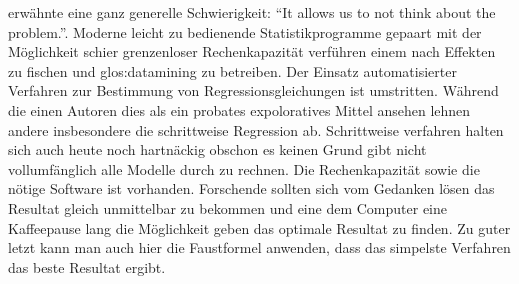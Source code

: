  erwähnte eine ganz generelle Schwierigkeit: ``It allows us to not think about the problem.''.
Moderne leicht zu bedienende Statistikprogramme gepaart mit der Möglichkeit schier grenzenloser Rechenkapazität verführen einem nach Effekten zu fischen und \gls{glos:datamining} zu betreiben.
Der Einsatz automatisierter Verfahren zur Bestimmung von Regressionsgleichungen ist umstritten. 
Während die einen Autoren dies als ein probates expoloratives Mittel ansehen lehnen andere insbesondere die schrittweise Regression ab. 
Schrittweise verfahren halten sich auch heute noch hartnäckig obschon es keinen Grund gibt nicht vollumfänglich alle Modelle durch zu rechnen. 
Die Rechenkapazität sowie die nötige Software ist vorhanden. 
Forschende sollten sich vom Gedanken lösen das Resultat gleich unmittelbar zu bekommen und eine dem Computer eine Kaffeepause lang die Möglichkeit geben das optimale Resultat zu finden.
Zu guter letzt kann man auch hier die Faustformel anwenden, dass das simpelste Verfahren das beste Resultat ergibt.